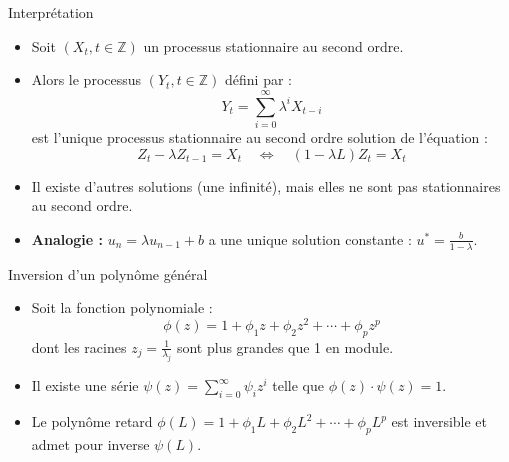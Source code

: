 \documentclass[11pt,aspectratio=169]{beamer}
\newcommand{\Z}{\mathbb{Z}}
\begin{document}
\begin{frame}{Interprétation}

\begin{itemize}

\item Soit $(X_t, t \in \Z)$ un processus stationnaire au second ordre.\newline

\item Alors le processus $(Y_t, t \in \Z)$ défini par :
  \[
  Y_t = \sum_{i=0}^{\infty} \lambda^i X_{t-i}
  \]
  est l'unique processus stationnaire au second ordre solution de l'équation :
  \[
  Z_t - \lambda Z_{t-1} = X_t \quad \Leftrightarrow \quad (1 - \lambda L) Z_t = X_t
  \]\newline

\item Il existe d'autres solutions (une infinité), mais elles ne sont pas stationnaires au second ordre.\newline

\item \textbf{Analogie :} $u_n = \lambda u_{n-1} + b$ a une unique solution constante : $u^* = \frac{b}{1-\lambda}$.

\end{itemize}

\end{frame}

\begin{frame}{Inversion d'un polynôme général}

\begin{itemize}

\item Soit la fonction polynomiale :
  \[
  \phi(z) = 1 + \phi_1 z + \phi_2 z^2 + \cdots + \phi_p z^p
  \]
  dont les racines $z_j = \frac{1}{\lambda_j}$ sont plus grandes que 1 en module.\newline

\item Il existe une série $\psi(z) = \sum_{i=0}^{\infty} \psi_i z^i$ telle que $\phi(z) \cdot \psi(z) = 1$.\newline

\item Le polynôme retard $\phi(L) = 1 + \phi_1 L + \phi_2 L^2 + \cdots + \phi_p L^p$ est inversible et admet pour inverse $\psi(L)$.

\end{itemize}

\end{frame}
\end{document}
